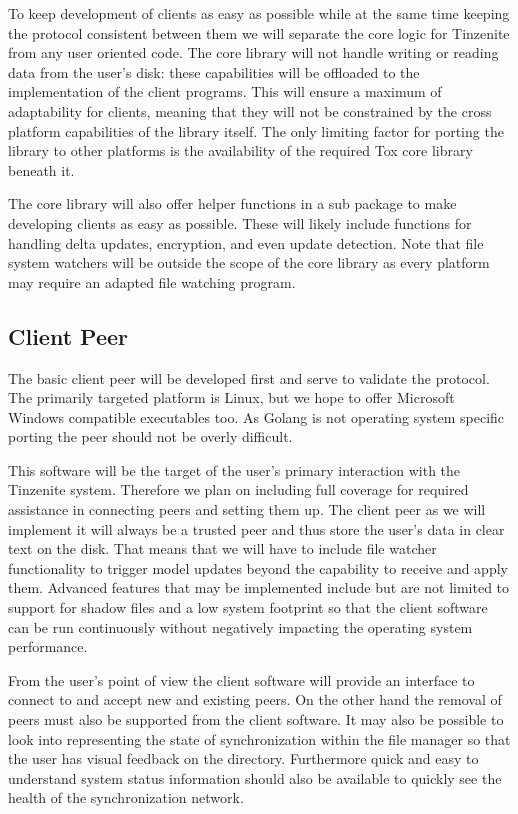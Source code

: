 To keep development of clients as easy as possible while at the same time keeping the protocol consistent between them we will separate the core logic for Tinzenite from any user oriented code.
The core library will not handle writing or reading data from the user's disk: these capabilities will be offloaded to the implementation of the client programs.
This will ensure a maximum of adaptability for clients, meaning that they will not be constrained by the cross platform capabilities of the library itself.
The only limiting factor for porting the library to other platforms is the availability of the required Tox core library beneath it.

The core library will also offer helper functions in a sub package to make developing clients as easy as possible.
These will likely include functions for handling delta updates, encryption, and even update detection.
Note that file system watchers will be outside the scope of the core library as every platform may require an adapted file watching program.

\subsection{Client Peer}

The basic client peer will be developed first and serve to validate the protocol.
The primarily targeted platform is Linux, but we hope to offer Microsoft Windows compatible executables too.
As Golang is not operating system specific porting the peer should not be overly difficult.

This software will be the target of the user's primary interaction with the Tinzenite system.
Therefore we plan on including full coverage for required assistance in connecting peers and setting them up.
The client peer as we will implement it will always be a trusted peer and thus store the user's data in clear text on the disk.
That means that we will have to include file watcher functionality to trigger model updates beyond the capability to receive and apply them.
Advanced features that may be implemented include but are not limited to support for shadow files and a low system footprint so that the client software can be run continuously without negatively impacting the operating system performance.

From the user's point of view the client software will provide an interface to connect to and accept new and existing peers.
On the other hand the removal of peers must also be supported from the client software.
It may also be possible to look into representing the state of synchronization within the file manager so that the user has visual feedback on the directory.
Furthermore quick and easy to understand system status information should also be available to quickly see the health of the synchronization network.

